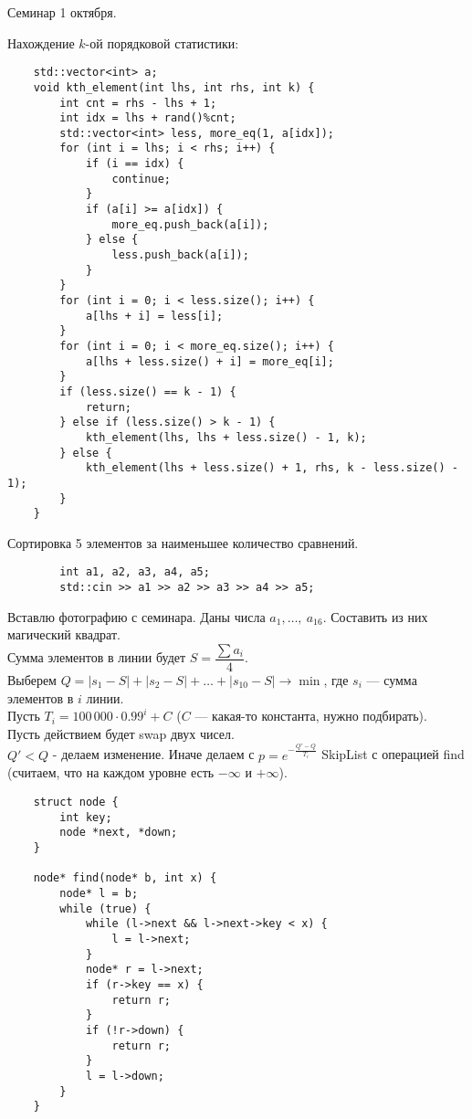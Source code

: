 \documentclass[12pt, a4paper]{article}
\begin{document}
    \begin{center}
        Семинар 1 октября.
    \end{center}
    \newpage
    Нахождение $k$-ой порядковой статистики:
    \begin{lstlisting}
    std::vector<int> a;
    void kth_element(int lhs, int rhs, int k) {
        int cnt = rhs - lhs + 1;
        int idx = lhs + rand()%cnt;
        std::vector<int> less, more_eq(1, a[idx]);
        for (int i = lhs; i < rhs; i++) {
            if (i == idx) {
                continue;
            }
            if (a[i] >= a[idx]) {
                more_eq.push_back(a[i]);
            } else {
                less.push_back(a[i]);
            }
        }
        for (int i = 0; i < less.size(); i++) {
            a[lhs + i] = less[i];
        }
        for (int i = 0; i < more_eq.size(); i++) {
            a[lhs + less.size() + i] = more_eq[i];
        }
        if (less.size() == k - 1) {
            return;
        } else if (less.size() > k - 1) {
            kth_element(lhs, lhs + less.size() - 1, k);
        } else {
            kth_element(lhs + less.size() + 1, rhs, k - less.size() - 1);
        }
    }
    \end{lstlisting}
    \newpage
    Сортировка 5 элементов за наименьшее количество сравнений.
    \begin{lstlisting}
        int a1, a2, a3, a4, a5;
        std::cin >> a1 >> a2 >> a3 >> a4 >> a5;
    \end{lstlisting}
    Вставлю фотографию с семинара.
    \newpage
    Даны числа $a_1,\dots,\ a_{16}$. Составить из них магический квадрат.\\
    Сумма элементов в линии будет $S = \dfrac{\sum a_i}{4}$.\\
    Выберем $Q = |s_1 - S| + |s_2 - S| + \dots + |s_{10} - S|\to \min$, где $s_i$ --- сумма элементов в $i$ линии.\\
    Пусть $T_i = 100\,000\cdot 0.99^i + C$ ($C$ --- какая-то константа, нужно подбирать).\\
    Пусть действием будет swap двух чисел.\\
    $Q' < Q$ - делаем изменение. Иначе делаем с $p = e^{-\frac{Q' - Q}{T_i}}$
    \newpage
    SkipList с операцией find (считаем, что на каждом уровне есть $-\infty$ и $+\infty$).
    \begin{lstlisting}
    struct node {
        int key;
        node *next, *down;
    }
    
    node* find(node* b, int x) {
        node* l = b;
        while (true) {
            while (l->next && l->next->key < x) {
                l = l->next;
            }
            node* r = l->next;
            if (r->key == x) {
                return r;
            }
            if (!r->down) {
                return r;
            }
            l = l->down;
        }
    }
    \end{lstlisting}
\end{document}
